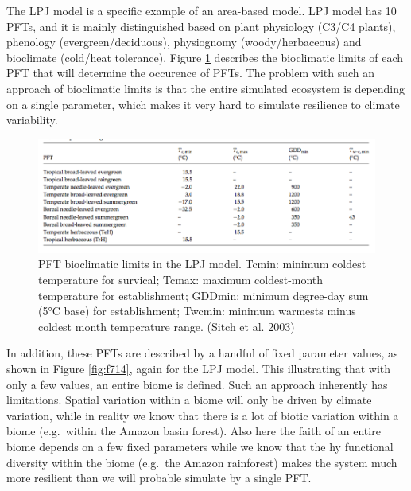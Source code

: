 \documentclass[12pt,oneside]{book}
\begin{document}
The LPJ model is a specific example of an area-based model. LPJ model
has 10 PFTs, and it is mainly distinguished based on plant physiology
(C3/C4 plants), phenology (evergreen/deciduous), physiognomy
(woody/herbaceous) and bioclimate (cold/heat tolerance). Figure
\ref{fig:f713} describes the bioclimatic limits of each PFT that will
determine the occurence of PFTs. The problem with such an approach of
bioclimatic limits is that the entire simulated ecosystem is depending
on a single parameter, which makes it very hard to simulate resilience
to climate variability.

\begin{figure}

{\centering \includegraphics[width=1\linewidth]{figures/chap7/f713_lpj_bioclim_table} 

}

\caption{PFT bioclimatic limits in the LPJ model. Tcmin: minimum coldest temperature for survical; Tcmax: maximum coldest-month temperature for establishment; GDDmin: minimum degree-day sum (5°C base) for establishment; Twcmin: minimum warmests minus coldest month temperature range. (Sitch et al. 2003)}\label{fig:f713}
\end{figure}

In addition, these PFTs are described by a handful of fixed parameter
values, as shown in Figure \ref{fig:f714}, again for the LPJ model. This
illustrating that with only a few values, an entire biome is defined.
Such an approach inherently has limitations. Spatial variation within a
biome will only be driven by climate variation, while in reality we know
that there is a lot of biotic variation within a biome (e.g.~within the
Amazon basin forest). Also here the faith of an entire biome depends on
a few fixed parameters while we know that the hy functional diversity
within the biome (e.g.~the Amazon rainforest) makes the system much more
resilient than we will probable simulate by a single PFT.
\end{document}
